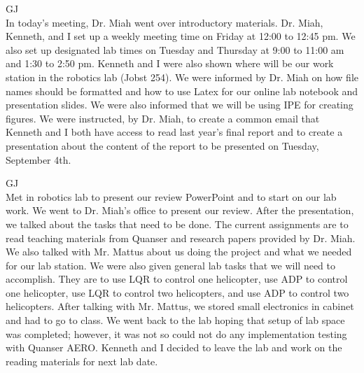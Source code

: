 \documentclass[fontsize=11pt, %
                             paper=letter, %
                             openany, %
                             captions=tableheading,
                             index=totoc,
                             hyperref]{labbook}
\begin{document}
\begin{addmargin}[0cm]{0cm} %

\pagestyle{scrheadings} %



GJ \\
In today's meeting, Dr. Miah went over introductory materials.  Dr. Miah, Kenneth, and I set up a weekly meeting time on Friday at 12:00 to 12:45 pm.  We also set up designated lab times on Tuesday and Thursday at 9:00 to 11:00 am and 1:30 to 2:50 pm. Kenneth and I were also shown where will be our work station in the robotics lab (Jobst 254).  We were informed by Dr. Miah on how file names should be formatted and how to use Latex for our online lab notebook and presentation slides.  We were also informed that we will be using IPE for creating figures.  We were instructed, by Dr. Miah, to create a common email that Kenneth and I both have access to read last year's final report and to create a presentation about the content of the report to be presented on Tuesday, September 4th.



GJ \\
Met in robotics lab to present our review PowerPoint and to start on our lab work.  We went to Dr. Miah's office to present our review.  After the presentation, we talked about the tasks that need to be done.  The current assignments are to read teaching materials from Quanser and research papers provided by Dr. Miah.  We also talked with Mr. Mattus about us doing the project and what we needed for our lab station.  We were also given general lab tasks that we will need to accomplish.  They are to use LQR to control one helicopter, use ADP to control one helicopter, use LQR to control two helicopters, and use ADP to control two helicopters.  After talking with Mr. Mattus, we stored small electronics in cabinet and had to go to class.  We went back to the lab hoping that setup of lab space was completed; however, it was not so could not do any implementation testing with Quanser AERO.  Kenneth and I decided to leave the lab and work on the reading materials for next lab date.


\end{addmargin}
\end{document}
